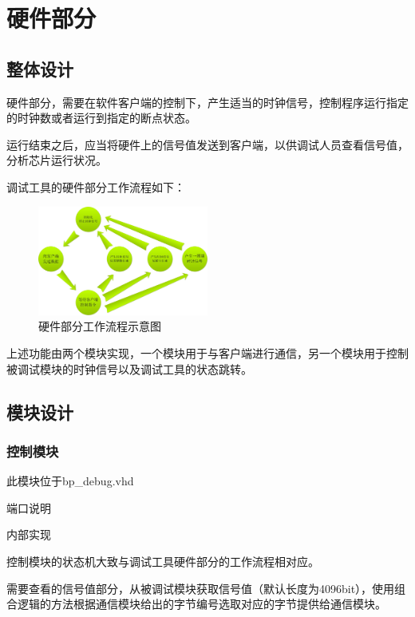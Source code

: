 \section{硬件部分}
    \subsection{整体设计}
        硬件部分，需要在软件客户端的控制下，产生适当的时钟信号，控制程序运行指定的时钟数或者运行到指定的断点状态。

        运行结束之后，应当将硬件上的信号值发送到客户端，以供调试人员查看信号值，分析芯片运行状况。

        调试工具的硬件部分工作流程如下：

        \begin{figure}[!hbp]
            \centering
            \caption{硬件部分工作流程示意图}
            \includegraphics[width=0.5\textwidth]{chart/hardware_path.jpg}
        \end{figure}

        上述功能由两个模块实现，一个模块用于与客户端进行通信，另一个模块用于控制被调试模块的时钟信号以及调试工具的状态跳转。
    \subsection{模块设计}
        \subsubsection{控制模块}
            此模块位于bp\_debug.vhd

            端口说明

                

            内部实现

                控制模块的状态机大致与调试工具硬件部分的工作流程相对应。

                需要查看的信号值部分，从被调试模块获取信号值（默认长度为4096bit），使用组合逻辑的方法根据通信模块给出的字节编号选取对应的字节提供给通信模块。

